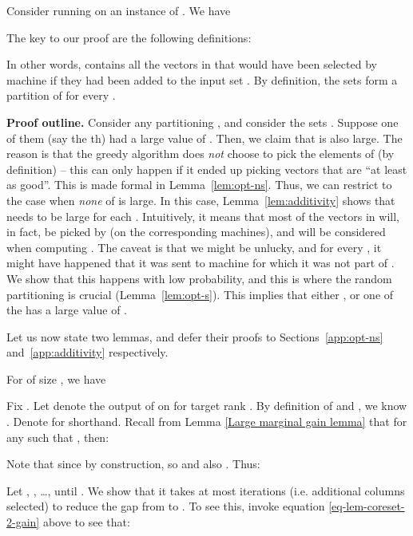 \documentclass{article}
\begin{document}
\begin{thm}\label{thm:distributed-main}
Consider running  on an instance of . We have
 
\end{thm}
The key to our proof are the following definitions:

In other words,  contains all the vectors in  that would have been selected by machine  if they had been added to the input set . By definition, the sets  form a partition of  for every .

\iffalse
\begin{remark} \label{rem-opt-partition}
By definition,  is a union of disjoint sets for all . That is,  and  partition .
\end{remark}
\fi

{\bf Proof outline.} Consider any partitioning , and consider the sets . Suppose one of them (say the th) had a large value of . Then, we claim that  is also large. The reason is that the greedy algorithm does {\em not} choose to pick the elements of  (by definition) -- this can only happen if it ended up picking vectors that are ``at least as good''. This is made formal in Lemma~\ref{lem:opt-ns}.  Thus, we can restrict to the case when {\em none} of  is large. In this case, Lemma~\ref{lem:additivity} shows that  needs to be large for each . Intuitively, it means that most of the vectors in  will, in fact, be picked by  (on the corresponding machines), and will be considered when computing . The caveat is that we might be unlucky, and for every , it might have happened that it was sent to machine  for which it was not part of . We show that this happens with low probability, and this is where the random partitioning is crucial (Lemma~\ref{lem:opt-s}).  This implies that either , or one of the  has a large value of .

Let us now state two lemmas, and defer their proofs to Sections~\ref{app:opt-ns} and~\ref{app:additivity} respectively. 

\begin{lemma} \label{lem:opt-ns}
For  of size , we have
 
\end{lemma}
\iffalse
Fix . Let  denote the output of  on  for target rank . By definition of  and , we know . Denote  for shorthand. Recall from Lemma \ref{Large marginal gain lemma} that for any  such that , then:

Note that since  by construction, so  and also . Thus:

Let , , \dots,  until . We show that it takes at most  iterations (i.e. additional columns selected) to reduce the gap from  to . To see this, invoke equation \eqref{eq-lem-coreset-2-gain} above to see that:
\end{document}
